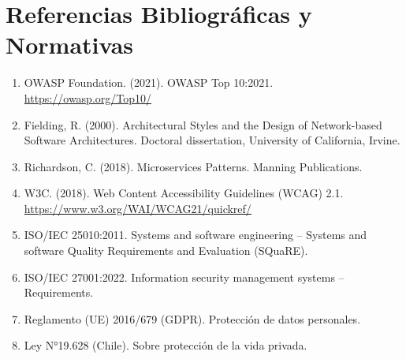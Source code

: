 \documentclass[a4paper,11pt,spanish]{article}
\begin{document}
\newpage

\section{Referencias Bibliográficas y Normativas}

\begin{enumerate}
    \item OWASP Foundation. (2021). OWASP Top 10:2021. \url{https://owasp.org/Top10/}
    \item Fielding, R. (2000). Architectural Styles and the Design of Network-based Software Architectures. Doctoral dissertation, University of California, Irvine.
    \item Richardson, C. (2018). Microservices Patterns. Manning Publications.
    \item W3C. (2018). Web Content Accessibility Guidelines (WCAG) 2.1. \url{https://www.w3.org/WAI/WCAG21/quickref/}
    \item ISO/IEC 25010:2011. Systems and software engineering -- Systems and software Quality Requirements and Evaluation (SQuaRE).
    \item ISO/IEC 27001:2022. Information security management systems -- Requirements.
    \item Reglamento (UE) 2016/679 (GDPR). Protección de datos personales.
    \item Ley N°19.628 (Chile). Sobre protección de la vida privada.
\end{enumerate}
\end{document}
